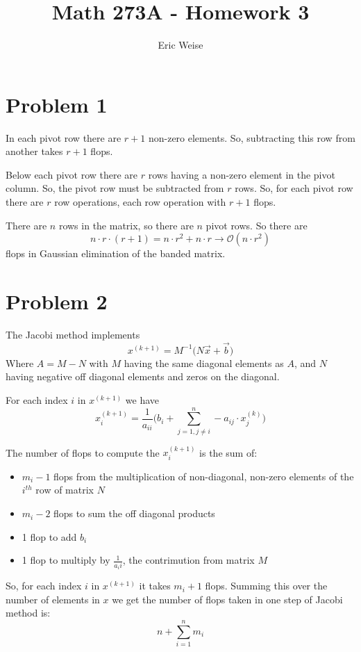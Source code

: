 \documentclass{article}
\title{Math 273A - Homework 3}
\author{Eric Weise}
\begin{document}
\maketitle

\section*{Problem 1}
In each pivot row there are $r+1$ non-zero elements.
So, subtracting this row from another takes $r+1$ flops.

Below each pivot row there are $r$ rows having a non-zero element in the pivot column. So, the pivot row must be subtracted from $r$ rows.
So, for each pivot row there are $r$ row operations, each row operation with $r+1$ flops.

There are $n$ rows in the matrix, so there are $n$ pivot rows.
So there are 
\[n \cdot r \cdot (r+1) = n\cdot r^2 + n \cdot r \to \mathcal{O}(n \cdot r^2) \]
flops in Gaussian elimination of the banded matrix.

\section*{Problem 2}
The Jacobi method implements 
\[ x^{(k+1)} = M^{-1}\big(N\vec{x} + \vec{b}\big) \]
Where \(A = M-N\) with $M$ having the same diagonal elements as $A$, and $N$ having negative off diagonal elements and zeros on the diagonal.

For each index $i$ in $x^{(k+1)}$ we have 
\[ x^{(k+1)}_i = \frac{1}{a_{ii}} \Big( b_i + \sum_{j=1, j \neq i}^{n} -a_{ij} \cdot x^{(k)}_j \Big) \]

The number of flops to compute the $x_i^{(k+1)}$ is the sum of:
\begin{itemize}
    \item \(m_i - 1\) flops from the multiplication of non-diagonal, non-zero elements of the $i^{th}$ row of matrix $N$
    \item $m_i - 2$ flops to sum the off diagonal products
    \item 1 flop to add $b_i$
    \item 1 flop to multiply by $\frac{1}{a_ii}$, the contrimution from matrix $M$
\end{itemize}

So, for each index $i$ in $x^{(k+1)}$ it takes $m_i+1$ flops. Summing this over the number of elements in $x$ we get the number of flops taken in one step of Jacobi method is:
\[n + \sum_{i=1}^{n}m_i\]
\end{document}
